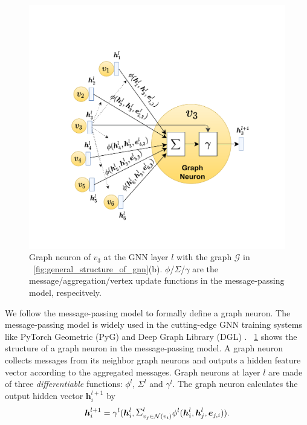 \begin{figure}
    \centering
    \includegraphics[width=0.5\columnwidth]{figs/illustration/GNN_Unit.pdf}
    \caption{Graph neuron of $v_3$ at the GNN layer $l$ with the graph $\mathcal{G}$ in \figurename~\ref{fig:general_structure_of_gnn}(b). $\phi$/$\Sigma$/$\gamma$ are the message/aggregation/vertex update functions in the message-passing model, respecitvely.}
    \label{fig:graph_neuron_structure}
\end{figure}

We follow the message-passing model \cite{gilmer_messgae_passing} to formally define a graph neuron.
The message-passing model is widely used in the cutting-edge GNN training systems like PyTorch Geometric (PyG) \cite{PyG} and Deep Graph Library (DGL) \cite{DGL}.
\figurename~\ref{fig:graph_neuron_structure} shows the structure of a graph neuron in the message-passing model.
A graph neuron collects messages from its neighbor graph neurons and outputs a hidden feature vector according to the aggregated messages.
Graph neurons at layer $l$ are made of three \emph{differentiable} functions: $\phi^l$, $\Sigma^l$ and $\gamma^l$.
The graph neuron calculates the output hidden vector $\boldsymbol{h}^{l+1}_i$ by
$$
    \boldsymbol{h}^{l+1}_i = \gamma^l(\boldsymbol{h}^l_i, \mathlarger{\Sigma}^l_{v_j \in \mathcal{N}(v_i)}{\phi^l(\boldsymbol{h}^l_i, \boldsymbol{h}^l_j,   \boldsymbol{e}_{j,i})}).
$$

